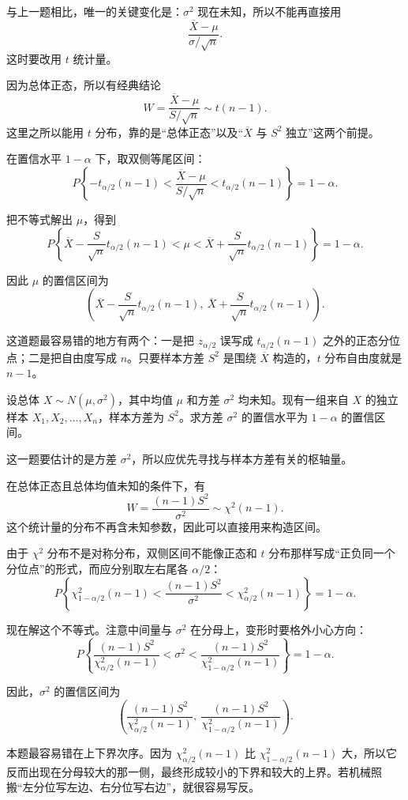 ﻿\documentclass[lang=cn,11pt]{elegantbook}
\begin{document}
\begin{solution}
与上一题相比，唯一的关键变化是：\(\sigma^2\) 现在未知，所以不能再直接用
\[
\frac{\overline{X}-\mu}{\sigma/\sqrt{n}}.
\]
这时要改用 \(t\) 统计量。

因为总体正态，所以有经典结论
\[
W=\frac{\overline{X}-\mu}{S/\sqrt{n}}\sim t(n-1).
\]
这里之所以能用 \(t\) 分布，靠的是“总体正态”以及“\(\overline{X}\) 与 \(S^2\) 独立”这两个前提。

在置信水平 \(1-\alpha\) 下，取双侧等尾区间：
\[
P\left\{-t_{\alpha/2}(n-1)<\frac{\overline{X}-\mu}{S/\sqrt{n}}<t_{\alpha/2}(n-1)\right\}=1-\alpha.
\]

把不等式解出 \(\mu\)，得到
\[
P\left\{\overline{X}-\frac{S}{\sqrt{n}}t_{\alpha/2}(n-1)<\mu<\overline{X}+\frac{S}{\sqrt{n}}t_{\alpha/2}(n-1)\right\}=1-\alpha.
\]

因此 \(\mu\) 的置信区间为
\[
\left(\overline{X}-\frac{S}{\sqrt{n}}t_{\alpha/2}(n-1),\ \overline{X}+\frac{S}{\sqrt{n}}t_{\alpha/2}(n-1)\right).
\]

\begin{note}
这道题最容易错的地方有两个：一是把 \(z_{\alpha/2}\) 误写成 \(t_{\alpha/2}(n-1)\) 之外的正态分位点；二是把自由度写成 \(n\)。只要样本方差 \(S^2\) 是围绕 \(\overline{X}\) 构造的，\(t\) 分布自由度就是 \(n-1\)。
\end{note}
\end{solution}

\begin{exercise} \label{ex:ci_var_unknown_mu}
设总体 $X\sim N(\mu,\sigma^2)$，其中均值 $\mu$ 和方差 $\sigma^2$ 均未知。现有一组来自 $X$ 的独立样本 $X_1,X_2,\dots,X_n$，样本方差为 $S^2$。求方差 $\sigma^2$ 的置信水平为 $1-\alpha$ 的置信区间。
\end{exercise}

\begin{solution}
这一题要估计的是方差 \(\sigma^2\)，所以应优先寻找与样本方差有关的枢轴量。

在总体正态且总体均值未知的条件下，有
\[
W=\frac{(n-1)S^2}{\sigma^2}\sim\chi^2(n-1).
\]
这个统计量的分布不再含未知参数，因此可以直接用来构造区间。

由于 \(\chi^2\) 分布不是对称分布，双侧区间不能像正态和 \(t\) 分布那样写成“正负同一个分位点”的形式，而应分别取左右尾各 \(\alpha/2\)：
\[
P\left\{\chi^2_{1-\alpha/2}(n-1)<\frac{(n-1)S^2}{\sigma^2}<\chi^2_{\alpha/2}(n-1)\right\}=1-\alpha.
\]

现在解这个不等式。注意中间量与 \(\sigma^2\) 在分母上，变形时要格外小心方向：
\[
P\left\{\frac{(n-1)S^2}{\chi^2_{\alpha/2}(n-1)}<\sigma^2<\frac{(n-1)S^2}{\chi^2_{1-\alpha/2}(n-1)}\right\}=1-\alpha.
\]

因此，\(\sigma^2\) 的置信区间为
\[
\left(\frac{(n-1)S^2}{\chi^2_{\alpha/2}(n-1)},\ \frac{(n-1)S^2}{\chi^2_{1-\alpha/2}(n-1)}\right).
\]

\begin{note}
本题最容易错在上下界次序。因为 \(\chi^2_{\alpha/2}(n-1)\) 比 \(\chi^2_{1-\alpha/2}(n-1)\) 大，所以它反而出现在分母较大的那一侧，最终形成较小的下界和较大的上界。若机械照搬“左分位写左边、右分位写右边”，就很容易写反。
\end{note}
\end{solution}
\end{document}
